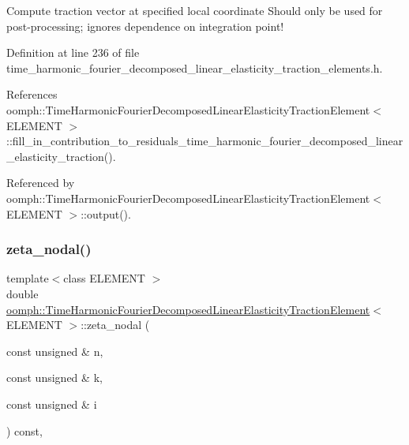 Compute traction vector at specified local coordinate Should only be used for post-\/processing; ignores dependence on integration point! 

Definition at line 236 of file time\+\_\+harmonic\+\_\+fourier\+\_\+decomposed\+\_\+linear\+\_\+elasticity\+\_\+traction\+\_\+elements.\+h.



References oomph\+::\+Time\+Harmonic\+Fourier\+Decomposed\+Linear\+Elasticity\+Traction\+Element$<$ E\+L\+E\+M\+E\+N\+T $>$\+::fill\+\_\+in\+\_\+contribution\+\_\+to\+\_\+residuals\+\_\+time\+\_\+harmonic\+\_\+fourier\+\_\+decomposed\+\_\+linear\+\_\+elasticity\+\_\+traction().



Referenced by oomph\+::\+Time\+Harmonic\+Fourier\+Decomposed\+Linear\+Elasticity\+Traction\+Element$<$ E\+L\+E\+M\+E\+N\+T $>$\+::output().

\mbox{\label{classoomph_1_1TimeHarmonicFourierDecomposedLinearElasticityTractionElement_aac54793d84bff0a227ee5fefa279b7ad}} 
\subsubsection{\texorpdfstring{zeta\+\_\+nodal()}{zeta\_nodal()}}
{\footnotesize\ttfamily template$<$class E\+L\+E\+M\+E\+NT $>$ \\
double \hyperlink{classoomph_1_1TimeHarmonicFourierDecomposedLinearElasticityTractionElement}{oomph\+::\+Time\+Harmonic\+Fourier\+Decomposed\+Linear\+Elasticity\+Traction\+Element}$<$ E\+L\+E\+M\+E\+NT $>$\+::zeta\+\_\+nodal (\begin{DoxyParamCaption}\item[{const unsigned \&}]{n,  }\item[{const unsigned \&}]{k,  }\item[{const unsigned \&}]{i }\end{DoxyParamCaption}) const\hspace{0.3cm}{\ttfamily [inline]}, {\ttfamily [virtual]}}



